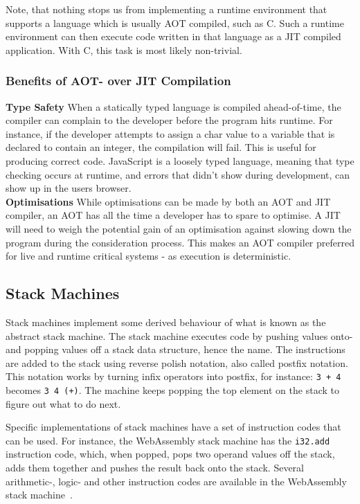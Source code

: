 \documentclass[a4paper]{article}
\begin{document}
Note, that nothing stops us from implementing a runtime environment that supports a language which is usually AOT compiled, such as C. Such a runtime environment can then execute code written in that language as a JIT compiled application. With C, this task is most likely non-trivial.

\subsubsection{Benefits of AOT- over JIT Compilation}
\label{sec:problem-analysis:benefits-of-aot}
\textbf{Type Safety} When a statically typed language is compiled ahead-of-time, the compiler can complain to the developer before the program hits runtime. For instance, if the developer attempts to assign a char value to a variable that is declared to contain an integer, the compilation will fail. This is useful for producing correct code. JavaScript is a loosely typed language, meaning that type checking occurs at runtime, and errors that didn't show during development, can show up in the users browser.\\

\noindent \textbf{Optimisations} While optimisations can be made by both an AOT and JIT compiler, an AOT has all the time a developer has to spare to optimise. A JIT will need to weigh the potential gain of an optimisation against slowing down the program during the consideration process. This makes an AOT compiler preferred for live and runtime critical systems - as execution is deterministic.

\subsection{Stack Machines}
Stack machines implement some derived behaviour of what is known as the abstract stack machine. The stack machine executes code by pushing values onto- and popping values off a stack data structure, hence the name. The instructions are added to the stack using reverse polish notation, also called postfix notation. This notation works by turning infix operators into postfix, for instance: \texttt{3 + 4} becomes \texttt{3 4 (+)}. The machine keeps popping the top element on the stack to figure out what to do next.

Specific implementations of stack machines have a set of instruction codes that can be used. For instance, the WebAssembly stack machine has the \texttt{i32.add} instruction code, which, when popped, pops two operand values off the stack, adds them together and pushes the result back onto the stack. Several arithmetic-, logic- and other instruction codes are available in the WebAssembly stack machine~\cite{website:wasm-binary-encoding}.
\end{document}
